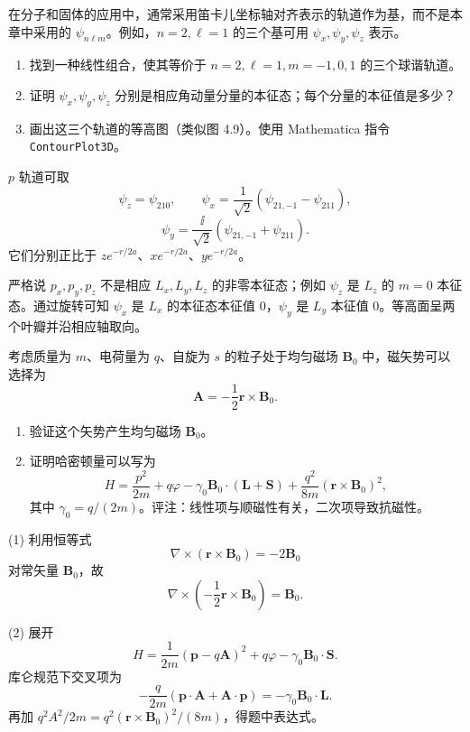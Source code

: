 \begin{question}
在分子和固体的应用中，通常采用笛卡儿坐标轴对齐表示的轨道作为基，而不是本章中采用的 $\psi_{n\ell m}$。例如，$n=2,\ell=1$ 的三个基可用 $\psi_x,\psi_y,\psi_z$ 表示。
\begin{enumerate}
\item 找到一种线性组合，使其等价于 $n=2,\ell=1,m=-1,0,1$ 的三个球谐轨道。
\item 证明 $\psi_x,\psi_y,\psi_z$ 分别是相应角动量分量的本征态；每个分量的本征值是多少？
\item 画出这三个轨道的等高图（类似图 4.9）。使用 Mathematica 指令 \texttt{ContourPlot3D}。
\end{enumerate}
\end{question}
\begin{solution}

$p$ 轨道可取
\[
\psi_z=\psi_{210},
\qquad
\psi_x=\frac{1}{\sqrt2}(\psi_{21,-1}-\psi_{211}),
\]
\[
\psi_y=\frac{\ii}{\sqrt2}(\psi_{21,-1}+\psi_{211}).
\]
它们分别正比于 $z e^{-r/2a}$、$x e^{-r/2a}$、$y e^{-r/2a}$。

严格说 $p_x,p_y,p_z$ 不是相应 $L_x,L_y,L_z$ 的非零本征态；例如 $\psi_z$ 是 $L_z$ 的 $m=0$ 本征态。通过旋转可知 $\psi_x$ 是 $L_x$ 的本征态本征值 0，$\psi_y$ 是 $L_y$ 本征值 0。等高面呈两个叶瓣并沿相应轴取向。

\end{solution}

\begin{question}
考虑质量为 $m$、电荷量为 $q$、自旋为 $s$ 的粒子处于均匀磁场 $\mathbf B_0$ 中，磁矢势可以选择为
\[
\mathbf A=-\frac12\mathbf r\times\mathbf B_0.
\]
\begin{enumerate}
\item 验证这个矢势产生均匀磁场 $\mathbf B_0$。
\item 证明哈密顿量可以写为
\[
H=\frac{p^2}{2m}+q\varphi-\gamma_0\mathbf B_0\cdot(\mathbf L+\mathbf S)+\frac{q^2}{8m}(\mathbf r\times\mathbf B_0)^2,
\]
其中 $\gamma_0=q/(2m)$。评注：线性项与顺磁性有关，二次项导致抗磁性。
\end{enumerate}
\end{question}
\begin{solution}

(1) 利用恒等式
\[
\nabla\times(\mathbf r\times\mathbf B_0)= -2\mathbf B_0
\]
对常矢量 $\mathbf B_0$，故
\[
\nabla\times\left(-\frac12\mathbf r\times\mathbf B_0\right)=\mathbf B_0.
\]

(2) 展开
\[
H=\frac{1}{2m}(\mathbf p-q\mathbf A)^2+q\varphi-\gamma_0\mathbf B_0\cdot\mathbf S.
\]
库仑规范下交叉项为
\[
-\frac{q}{2m}(\mathbf p\cdot\mathbf A+\mathbf A\cdot\mathbf p)=-\gamma_0\mathbf B_0\cdot\mathbf L.
\]
再加 $q^2A^2/2m=q^2(\mathbf r\times\mathbf B_0)^2/(8m)$，得题中表达式。

\end{solution}

